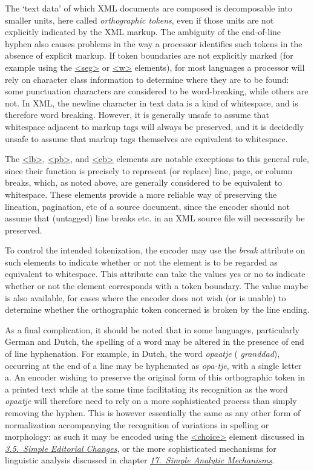The ‘text data’ of which XML documents are composed is decomposable into smaller units, here called \textit{orthographic tokens}, even if those units are not explicitly indicated by the XML markup. The ambiguity of the end-of-line hyphen also causes problems in the way a processor identifies such tokens in the absence of explicit markup. If token boundaries are not explicitly marked (for example using the \hyperref[TEI.seg]{<seg>} or \hyperref[TEI.w]{<w>} elements), for most languages a processor will rely on character class information to determine where they are to be found: some punctuation characters are considered to be word-breaking, while others are not. In XML, the newline character in text data is a kind of whitespace, and is therefore word breaking. However, it is generally unsafe to assume that whitespace adjacent to markup tags will always be preserved, and it is decidedly unsafe to assume that markup tags themselves are equivalent to whitespace.\par
The \hyperref[TEI.lb]{<lb>}, \hyperref[TEI.pb]{<pb>}, and \hyperref[TEI.cb]{<cb>} elements are notable exceptions to this general rule, since their function is precisely to represent (or replace) line, page, or column breaks, which, as noted above, are generally considered to be equivalent to whitespace. These elements provide a more reliable way of preserving the lineation, pagination, etc of a source document, since the encoder should not assume that (untagged) line breaks etc. in an XML source file will necessarily be preserved.\par
To control the intended tokenization, the encoder may use the {\itshape break} attribute on such elements to indicate whether or not the element is to be regarded as equivalent to whitespace. This attribute can take the values yes or no to indicate whether or not the element corresponds with a token boundary. The value maybe is also available, for cases where the encoder does not wish (or is unable) to determine whether the orthographic token concerned is broken by the line ending.\par
As a final complication, it should be noted that in some languages, particularly German and Dutch, the spelling of a word may be altered in the presence of end of line hyphenation. For example, in Dutch, the word \textit{opaatje} ( \textit{granddad}), occurring at the end of a line may be hyphenated as \textit{opa-tje}, with a single letter a. An encoder wishing to preserve the original form of this orthographic token in a printed text while at the same time facilitating its recognition as the word \textit{opaatje} will therefore need to rely on a more sophisticated process than simply removing the hyphen. This is however essentially the same as any other form of normalization accompanying the recognition of variations in spelling or morphology: as such it may be encoded using the \hyperref[TEI.choice]{<choice>} element discussed in \textit{\hyperref[COED]{3.5.\ Simple Editorial Changes}}, or the more sophisticated mechanisms for linguistic analysis discussed in chapter \textit{\hyperref[AI]{17.\ Simple Analytic Mechanisms}}.
